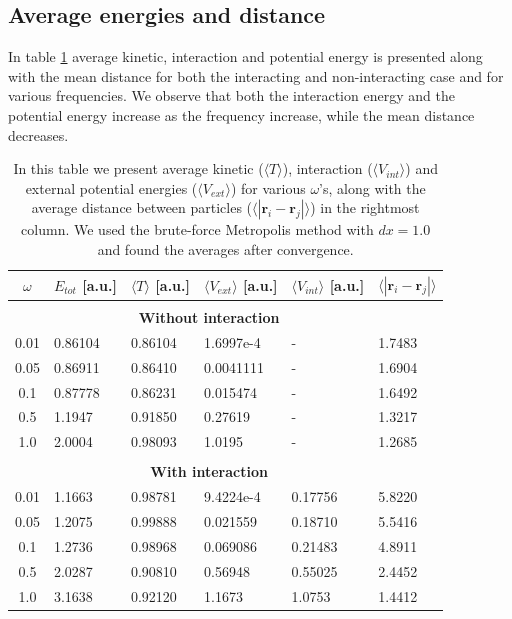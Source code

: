 \documentclass[norsk,a4paper,12pt]{article}
\begin{document}
\subsection{Average energies and distance}
In table \ref{tab:average_energies} average kinetic, interaction and potential energy is presented along with the mean distance for both the interacting and non-interacting case and for various frequencies. We observe that both the interaction energy and the potential energy increase as the frequency increase, while the mean distance decreases.

\begin{table} [H]
	\caption{In this table we present average kinetic ($\langle T\rangle$), interaction ($\langle V_{int}\rangle$) and external potential energies ($\langle V_{ext}\rangle$) for various $\omega$'s, along with the average distance between particles ($\langle |\boldsymbol{r}_i-\boldsymbol{r}_j|\rangle$) in the rightmost column. We used the brute-force Metropolis method with $dx=1.0$ and found the averages after convergence.  \vspace{2mm}}
	\begin{tabularx}{\textwidth}{c|XXXXX} \hline\hline
		\label{tab:average_energies}
		$\omega$ & $ E_{tot}$ [a.u.] & $\langle T\rangle$ [a.u.] & $\langle V_{ext}\rangle$ [a.u.] & $\langle V_{int}\rangle$ [a.u.] & $\langle |\boldsymbol{r}_i-\boldsymbol{r}_j|\rangle$ \\ \hline \\
				& \multicolumn{4}{c}{\textbf{Without interaction}}\\ \hline
				0.01 & 0.86104 & 0.86104 & 1.6997e-4 & - & 1.7483 \\
				0.05 & 0.86911 & 0.86410 & 0.0041111 & - & 1.6904 \\
				0.1 & 0.87778 & 0.86231 & 0.015474 & - & 1.6492 \\
				0.5 & 1.1947 & 0.91850 & 0.27619 & - & 1.3217 \\
				1.0 & 2.0004 & 0.98093 & 1.0195 & - & 1.2685 \\ \hline \\
		& \multicolumn{4}{c}{\textbf{With interaction}}\\ \hline
				0.01 & 1.1663 & 0.98781 & 9.4224e-4 & 0.17756 & 5.8220 \\
				0.05 & 1.2075 & 0.99888 & 0.021559 & 0.18710 & 5.5416 \\
				0.1 & 1.2736 & 0.98968 & 0.069086 & 0.21483 & 4.8911 \\
				0.5 & 2.0287 & 0.90810 & 0.56948 & 0.55025 & 2.4452 \\
				1.0 & 3.1638 & 0.92120 & 1.1673 & 1.0753 & 1.4412 \\ \hline
	\end{tabularx}
\end{table}
\end{document}
